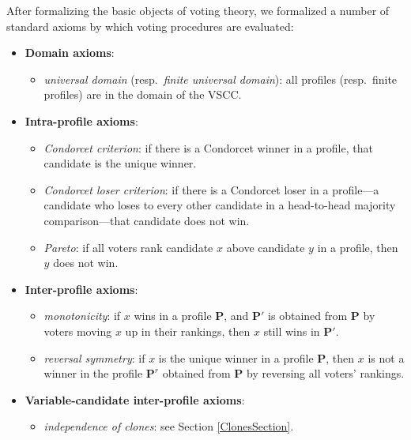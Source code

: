 \documentclass[runningheads]{llncs}
\begin{document}
After formalizing the basic objects of voting theory, we  formalized a number of standard axioms by which voting procedures are evaluated:
\begin{itemize}
\item[] \textbf{Domain axioms}:
\begin{itemize}
\item \textit{universal domain} (resp.~\textit{finite universal domain}): all profiles (resp.~finite profiles) are in the domain of the VSCC.\\
\end{itemize}
\item[] \textbf{Intra-profile axioms}:
\begin{itemize}
\item \textit{Condorcet criterion}: if there is a Condorcet winner in a profile, that candidate is the unique winner.
\item \textit{Condorcet loser criterion}: if there is a Condorcet loser in a profile---a candidate who loses to every other candidate in a head-to-head majority comparison---that candidate does not win.
\item \textit{Pareto}: if all voters rank candidate $x$ above candidate $y$ in a profile, then $y$ does not win.\\
\end{itemize}
\item[] \textbf{Inter-profile axioms}:
\begin{itemize}
\item \textit{monotonicity}: if $x$ wins in a profile $\mathbf{P}$, and $\mathbf{P}'$ is obtained from $\mathbf{P}$ by voters moving $x$ up in their rankings, then $x$ still wins in $\mathbf{P}'$.
\item \textit{reversal symmetry}: if $x$ is the unique winner in a profile $\mathbf{P}$, then $x$ is not a winner in the profile $\mathbf{P}^r$ obtained from $\mathbf{P}$ by reversing all voters' rankings.\\
\end{itemize}
\item[] \textbf{Variable-candidate inter-profile axioms}:
\begin{itemize}
\item \textit{independence of clones}: see Section \ref{ClonesSection}.

\end{itemize}
\end{itemize}
\end{document}
